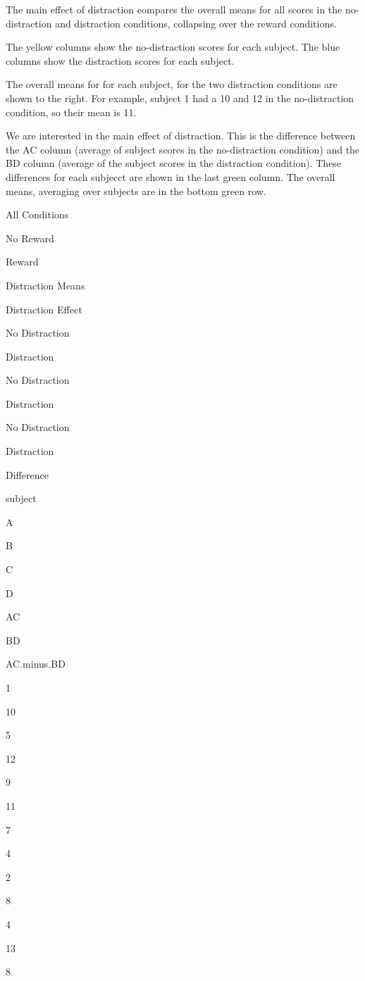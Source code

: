 \documentclass[]{book}
\begin{document}
The main effect of distraction compares the overall means for all scores in the no-distraction and distraction conditions, collapsing over the reward conditions.

The yellow columns show the no-distraction scores for each subject. The blue columns show the distraction scores for each subject.

The overall means for for each subject, for the two distraction conditions are shown to the right. For example, subject 1 had a 10 and 12 in the no-distraction condition, so their mean is 11.

We are interested in the main effect of distraction. This is the difference between the AC column (average of subject scores in the no-distraction condition) and the BD column (average of the subject scores in the distraction condition). These differences for each subjecct are shown in the last green column. The overall means, averaging over subjects are in the bottom green row.

All Conditions

No Reward

Reward

Distraction Means

Distraction Effect

No Distraction

Distraction

No Distraction

Distraction

No Distraction

Distraction

Difference

subject

A

B

C

D

AC

BD

AC.minus.BD

1

10

5

12

9

11

7

4

2

8

4

13

8
\end{document}
